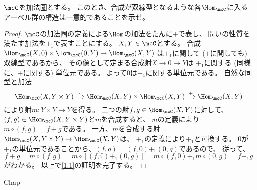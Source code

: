 \documentclass[uplatex,dvipdfmx]{jsarticle}
\begin{document}
\maketitle
\HeaderCommentA
\section{}
\fi

\begin{prob}\label{1.1}
  \(\mcC\)を加法圏とする。
  このとき、合成が双線型となるような各\(\Hom_{\mcC}\)に入るアーベル群の構造は一意的であることを示せ。
\end{prob}

\begin{proof}
  \(\mcC\)の加法圏の定義による\(\Hom\)の加法をたんに\(+\)で表し、
  問いの性質を満たす加法を\(+_1\)で表すことにする。
  \(X,Y\in \mcC\)とする。
  合成\(\Hom_{\mcC}(X,0)\times \Hom_{\mcC}(0,Y)\to \Hom_{\mcC}(X,Y)\)
  は\(+_1\)に関して (\(+\)に関しても) 双線型であるから、
  その像として定まる合成射\(X\to 0 \to Y\)は
  \(+_1\)に関する (同様に、\(+\)に関する) 単位元である。
  よって\(0\)は\(+_1\)に関する単位元である。
  自然な同型と加法
  \[
  \Hom_{\mcC}(X,Y\times Y) \xrightarrow{\sim}
  \Hom_{\mcC}(X,Y) \times \Hom_{\mcC}(X,Y) \xrightarrow{+} \Hom_{\mcC}(X,Y)
  \]
  により射\(m:Y\times Y\to Y\)を得る。
  二つの射\(f,g\in \Hom_{\mcC}(X,Y)\)に対して、
  \((f,g)\in \Hom_{\mcC}(X,Y\times Y)\)と\(m\)を合成すると、
  \(m\)の定義により\(m\circ (f,g) = f+g\)である。
  一方、\(m\)を合成する射
  \(\Hom_{\mcC}(X,Y\times Y) \to \Hom_{\mcC}(X,Y)\)は、
  \(+_1\)の定義により\(+_1\)と可換する。
  \(0\)が\(+_1\)の単位元であることから、\((f,g) = (f,0) +_1 (0,g)\)であるので、
  従って、
  \[
  f+g = m\circ (f,g) = m\circ [(f,0)+_1(0,g)]
  = m\circ (f,0) +_1 m\circ (0,g)
  = f+_1 g
  \]
  がわかる。
  以上で\autoref{1.1}の証明を完了する。
\end{proof}

\ifcsname Chap\endcsname\else
\printbibliography
\end{document}
